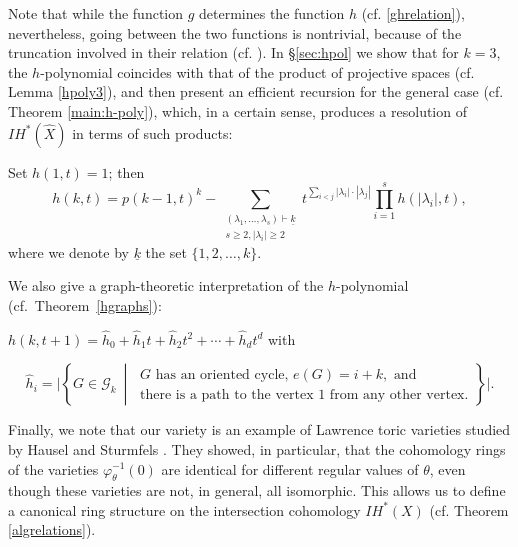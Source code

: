 Note that while  the function $ g $ determines the 
function $ h $ (cf.  \eqref{ghrelation}), nevertheless, going between the two 
functions is nontrivial, 
because of the truncation involved in their relation (cf.  \cite{Stanley}).  
In  \S\ref{sec:hpol} we show that for $ k=3 $, the $ h $-polynomial coincides 
with that of the product of projective spaces (cf.  Lemma \ref{hpoly3}), and 
then present 
an efficient recursion for the general case (cf.  Theorem \ref{main:h-poly}), 
which, in a certain sense, produces 
a resolution of $ IH^*(\widehat{X}) $ in terms of such products:
\begin{theorem} Set $h(1,t)=1$; then
\begin{equation*}
h(k,t)= p(k-1,t)^{k}-\sum_{\substack{ (\lambda_1, \ldots ,\lambda_s)\vdash \underline{k} \\ s\geq 2, |\lambda_i|\geq 2}} t^{\sum_{i<j}|\lambda_i|\cdot|\lambda_j|} \prod_{i=1}^sh(|\lambda_i|,t),
 \end{equation*}
where we denote by $\underline{k}$ the set $\{1,2, \ldots ,k\}$.
\end{theorem}
We also give a graph-theoretic interpretation of the $ h $-polynomial (cf.~Theorem~\ref{hgraphs}):
\begin{theorem} $h(k,t+1) = \hat{h}_0+ \hat{h}_1t+\hat{h}_2t^2+ \cdots +\hat{h}_dt^d$ with

\[
  \hat{h}_i = \bigg| \left\{ G\in\mathcal{G}_{k} \ \middle\vert\
  \begin{array}{l}
    G \text{ has an oriented cycle, } e(G)=i+k, \text{ and } \\
    \text{there is a path to the vertex $1$ from any other vertex.}
  \end{array}\right\} \bigg|.
\]
\end{theorem} 



Finally, we note that our variety is an example of Lawrence toric varieties
studied by Hausel and Sturmfels \cite{HSt}. They showed, in particular, 
that the 
cohomology rings of the varieties $\varphi^{-1}_\theta(0)$ 
are identical for different 
regular values of $ \theta $, even though these varieties are not, in general, 
all isomorphic. This allows us to define a canonical ring structure on the intersection cohomology 
$ IH^*(X) $  (cf.  Theorem \ref{algrelations}).







